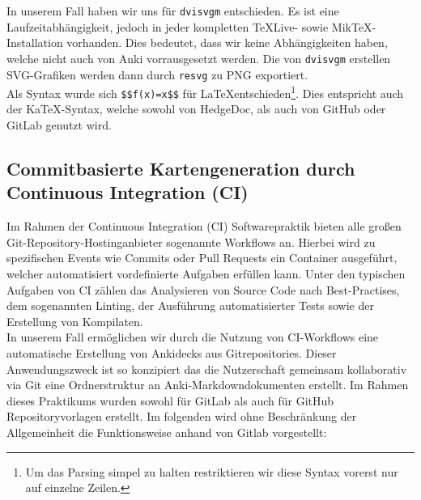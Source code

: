 \documentclass[ngerman]{article}
\begin{document}
In unserem Fall haben wir uns für \texttt{dvisvgm} entschieden. Es ist eine Laufzeitabhängigkeit, jedoch in jeder kompletten TeXLive- sowie MikTeX-Installation vorhanden. Dies bedeutet, dass wir keine Abhängigkeiten haben, welche nicht auch von Anki vorrausgesetzt werden. Die von \texttt{dvisvgm} erstellen SVG-Grafiken werden dann durch \texttt{resvg} \cite{resvg} zu PNG exportiert.\\

Als Syntax wurde sich \texttt{\$\$f(x)=x\$\$} für \LaTeX entschieden\footnote{Um das Parsing simpel zu halten restriktieren wir diese Syntax vorerst nur auf einzelne Zeilen.}. Dies entspricht auch der KaTeX-Syntax, welche sowohl von HedgeDoc, als auch von GitHub oder GitLab genutzt wird.

\subsection{Commitbasierte Kartengeneration durch Continuous Integration (CI)}
Im Rahmen der Continuous Integration (CI) Softwarepraktik bieten alle großen Git-Repository-Hostinganbieter sogenannte Workflows an. Hierbei wird zu spezifischen Events wie Commits oder Pull Requests ein Container ausgeführt, welcher automatisiert vordefinierte Aufgaben erfüllen kann. Unter den typischen Aufgaben von CI zählen das Analysieren von Source Code nach Best-Practises, dem sogenannten Linting, der Ausführung automatisierter Tests sowie der Erstellung von Kompilaten.\\

In unserem Fall ermöglichen wir durch die Nutzung von CI-Workflows eine automatische Erstellung von Ankidecks aus Gitrepositories. Dieser Anwendungszweck ist so konzipiert das die Nutzerschaft gemeinsam kollaborativ via Git eine Ordnerstruktur an Anki-Markdowndokumenten erstellt. Im Rahmen dieses Praktikums wurden sowohl für GitLab \cite{GitlabTemplate} als auch für GitHub \cite{GithubTemplate} Repositoryvorlagen erstellt. Im folgenden wird ohne Beschränkung der Allgemeinheit die Funktionsweise anhand von Gitlab vorgestellt:
\end{document}
